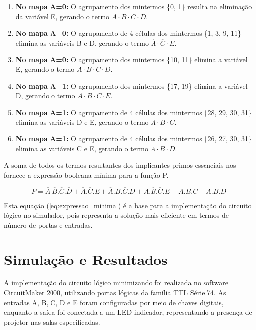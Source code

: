 \documentclass[a4paper, 12pt]{article}
\begin{document}
\begin{enumerate}
    \item \textbf{No mapa A=0:} O agrupamento dos mintermos \{0, 1\} resulta na eliminação da variável E, gerando o termo $\overline{A} \cdot \overline{B} \cdot \overline{C} \cdot \overline{D}$.
    \item \textbf{No mapa A=0:} O agrupamento de 4 células dos mintermos \{1, 3, 9, 11\} elimina as variáveis B e D, gerando o termo $\overline{A} \cdot \overline{C} \cdot E$.
    \item \textbf{No mapa A=0:} O agrupamento dos mintermos \{10, 11\} elimina a variável E, gerando o termo $\overline{A} \cdot B \cdot \overline{C} \cdot D$.
    \item \textbf{No mapa A=1:} O agrupamento dos mintermos \{17, 19\} elimina a variável D, gerando o termo $A \cdot \overline{B} \cdot \overline{C} \cdot E$.
    \item \textbf{No mapa A=1:} O agrupamento de 4 células dos mintermos \{28, 29, 30, 31\} elimina as variáveis D e E, gerando o termo $A \cdot B \cdot C$.
    \item \textbf{No mapa A=1:} O agrupamento de 4 células dos mintermos \{26, 27, 30, 31\} elimina as variáveis C e E, gerando o termo $A \cdot B \cdot D$.
\end{enumerate}

A soma de todos os termos resultantes dos implicantes primos essenciais nos fornece a expressão booleana mínima para a função P.

\begin{equation}
P = \overline{A}.\overline{B}.\overline{C}.\overline{D} + \overline{A}.\overline{C}.E + \overline{A}.B.\overline{C}.D + A.\overline{B}.\overline{C}.E + A.B.C + A.B.D
\label{eq:expressao_minima}
\end{equation}

Esta equação (\ref{eq:expressao_minima}) é a base para a implementação do circuito lógico no simulador, pois representa a solução mais eficiente em termos de número de portas e entradas.


\section{Simulação e Resultados}

A implementação do circuito lógico minimizando foi realizada no software CircuitMaker 2000, utilizando portas lógicas da família TTL Série 74. As entradas A, B, C, D e E foram configuradas por meio de chaves digitais, enquanto a saída foi conectada a um LED indicador, representando a presença de projetor nas salas especificadas.
\end{document}
